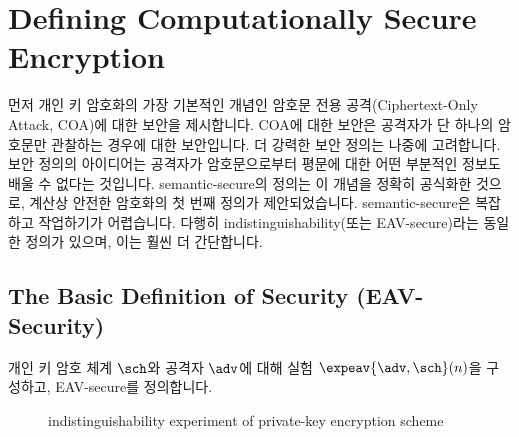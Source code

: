\section{Defining Computationally Secure Encryption}

먼저 개인 키 암호화의 가장 기본적인 개념인 암호문 전용 공격(Ciphertext-Only Attack, COA)에 대한 보안을 제시합니다. COA에 대한 보안은 공격자가 단 하나의 암호문만 관찰하는 경우에 대한 보안입니다. 더 강력한 보안 정의는 나중에 고려합니다. 보안 정의의 아이디어는 공격자가 암호문으로부터 평문에 대한 어떤 부분적인 정보도 배울 수 없다는 것입니다. semantic-secure의 정의는 이 개념을 정확히 공식화한 것으로, 계산상 안전한 암호화의 첫 번째 정의가 제안되었습니다. semantic-secure은 복잡하고 작업하기가 어렵습니다. 다행히 indistinguishability(또는 EAV-secure)라는 동일한 정의가 있으며, 이는 훨씬 더 간단합니다.

\subsection*{The Basic Definition of Security (EAV-Security)}

개인 키 암호 체계 $\sch$와 공격자 $\adv$에 대해 실험 $\expeav{\adv, \sch}(n)$을 구성하고, EAV-secure를 정의합니다.

\begin{figure}[h]
    \centering
    \caption{indistinguishability experiment of private-key encryption scheme}
    \label{fig:prieav}
\end{figure}

